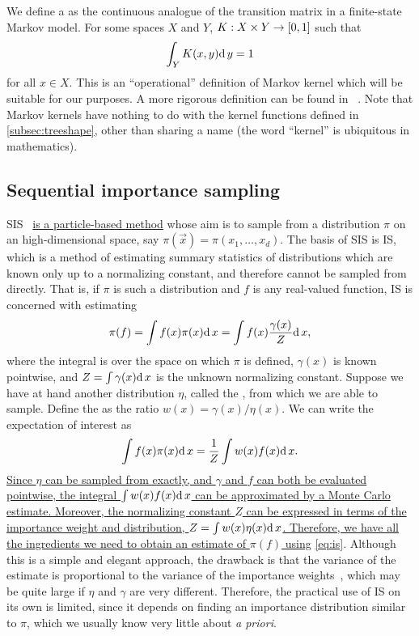 We define a  as the continuous analogue of the transition
matrix in a finite-state Markov model.  For some spaces $X$ and $Y$, $K : X
\times Y \to [0, 1]$ such that
\begin{align}
    \label{eq:mk}
    \int_Y K(x, y) \mathrm{d}\, y = 1
\end{align}
for all $x \in X$. This is an ``operational'' definition of Markov kernel which
will be suitable for our purposes. A more rigorous definition can be found in
\eg~\autocite{kallenberg2006foundations}. Note that Markov kernels have nothing
to do with the kernel functions defined in \cref{subsec:treeshape}, other than
sharing a name (the word ``kernel'' is ubiquitous in mathematics).

\subsection{Sequential importance sampling}
\label{subsec:sis}

\Gls{SIS}~\autocite{gordon1993novel} {\color{blue}\uline{is a particle-based
method}} whose aim is to sample from a distribution $\pi$ on an
high-dimensional space, say $\pi(\vec{x}) = \pi(x_1, \ldots, x_d)$. The basis
of \gls{SIS} is \gls{IS}, which is a method of estimating summary statistics of
distributions which are known only up to a normalizing constant, and therefore
cannot be sampled from directly. That is, if $\pi$ is such a distribution and
$f$ is any real-valued function, \gls{IS} is concerned with estimating
\[
  \pi(f) = \int f(x)\pi(x)\mathrm{d}\, x = \int f(x) \frac{\gamma(x)}{Z} \mathrm{d}\, x,
\]
where the integral is over the space on which $\pi$ is defined, $\gamma(x)$ is
known pointwise, and $Z = \int \gamma(x) \mathrm{d}\, x$ is the unknown normalizing
constant. Suppose we have at hand another distribution $\eta$, called the
, from which we are able to sample. Define the
 as the ratio $w(x) = \gamma(x)/\eta(x)$. We can write
the expectation of interest as
{\color{blue}
\begin{align}
  \int f(x) \pi(x) \mathrm{d}\, x = \frac{1}{Z} \int w(x) f(x) \mathrm{d}\, x.
  \label{eq:is}
\end{align}
}
{\color{blue}\uline{
Since $\eta$ can be sampled from exactly, and $\gamma$ and $f$ can both be
evaluated pointwise, the integral $\int w(x) f(x) \mathrm{d}\, x$ can be approximated by
a Monte Carlo estimate. Moreover, the normalizing constant $Z$ can be expressed
in terms of the importance weight and distribution, $Z = \int w(x) \eta(x) \mathrm{d}\,
x$. Therefore, we have all the ingredients we need to obtain an estimate of
$\pi(f)$ using} \cref{eq:is}.} Although this is a simple and elegant approach,
the drawback is that the variance of the estimate is proportional to the
variance of the importance weights~\autocite{liu2008monte}, which may be quite
large if $\eta$ and $\gamma$ are very different. Therefore, the practical use
of \gls{IS} on its own is limited, since it depends on finding an importance
distribution similar to $\pi$, which we usually know very little about
\textit{a priori}.

